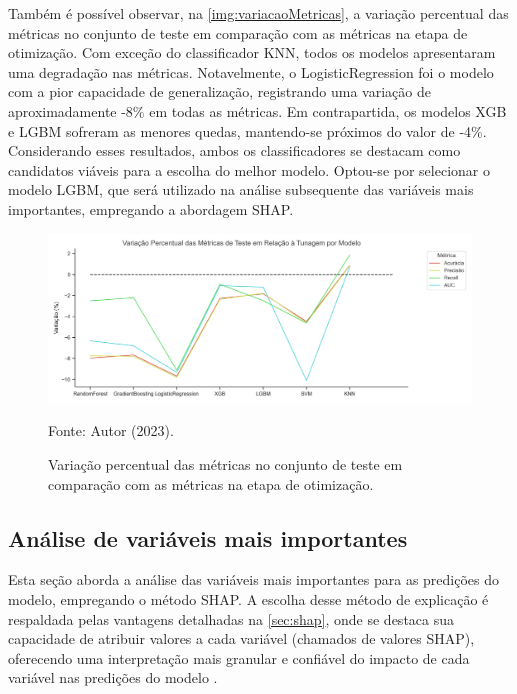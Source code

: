 Também é possível observar, na \autoref{img:variacaoMetricas}, a variação percentual das métricas no conjunto de teste em comparação com as métricas na etapa de otimização. Com exceção do classificador KNN, todos os modelos apresentaram uma degradação nas métricas. Notavelmente, o LogisticRegression foi o modelo com a pior capacidade de generalização, registrando uma variação de aproximadamente -8\% em todas as métricas. Em contrapartida, os modelos XGB e LGBM sofreram as menores quedas, mantendo-se próximos do valor de -4\%. Considerando esses resultados, ambos os classificadores se destacam como candidatos viáveis para a escolha do melhor modelo. Optou-se por selecionar o modelo LGBM, que será utilizado na análise subsequente das variáveis mais importantes, empregando a abordagem SHAP.

\begin{figure}
	\centering
	\caption{\label{img:variacaoMetricas}Variação percentual das métricas no conjunto de teste em comparação com as métricas na etapa de otimização.}
	\includegraphics[scale=0.7]{USPSC-img/variacao_pct_metricas_teste_por_modelo.png}
	\begin{center}
		Fonte: Autor (2023).
	\end{center}
\end{figure}

\subsection{Análise de variáveis mais importantes}

Esta seção aborda a análise das variáveis mais importantes para as predições do modelo, empregando o método SHAP. A escolha desse método de explicação é respaldada pelas vantagens detalhadas na \autoref{sec:shap}, onde se destaca sua capacidade de atribuir valores a cada variável (chamados de valores SHAP), oferecendo uma interpretação mais granular e confiável do impacto de cada variável nas predições do modelo \cite{Shap2017}.

